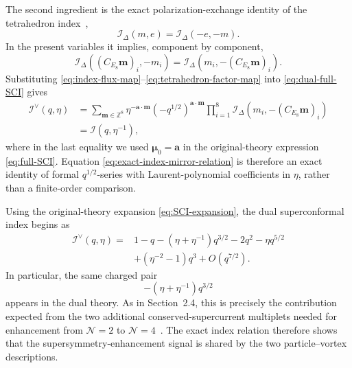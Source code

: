 \documentclass[11pt,a4paper]{article}
\numberwithin{equation}{section}
\begin{document}
The second ingredient is the exact polarization-exchange identity of the tetrahedron index~\cite{Dimofte:2011py},
\begin{equation}
  \mathcal I_\Delta(m,e)
  =\mathcal I_\Delta(-e,-m).
  \label{eq:tetrahedron-polarization-exchange}
\end{equation}
In the present variables it implies, component by component,
\begin{equation}
  \mathcal I_\Delta\!\left(
    (C_{E_8}\boldsymbol m)_i,-m_i
  \right)
  =
  \mathcal I_\Delta\!\left(
    m_i,-(C_{E_8}\boldsymbol m)_i
  \right).
  \label{eq:tetrahedron-factor-map}
\end{equation}
Substituting \eqref{eq:index-flux-map}--\eqref{eq:tetrahedron-factor-map} into \eqref{eq:dual-full-SCI} gives
\begin{align}
  \mathcal I^\vee(q,\eta)
  &={}
  \sum_{\boldsymbol m\in\mathbb Z^8}
  \eta^{-\boldsymbol a\cdot\boldsymbol m}
  \left(-q^{1/2}\right)^{\boldsymbol a\cdot\boldsymbol m}
  \prod_{i=1}^{8}
  \mathcal I_\Delta\!\left(
    m_i,-(C_{E_8}\boldsymbol m)_i
  \right)
  \nonumber\\
  &=\mathcal I(q,\eta^{-1}),
  \label{eq:exact-index-mirror-relation}
\end{align}
where in the last equality we used $\boldsymbol\mu_0=\boldsymbol a$ in the original-theory expression \eqref{eq:full-SCI}.  Equation \eqref{eq:exact-index-mirror-relation} is therefore an exact identity of formal $q^{1/2}$-series with Laurent-polynomial coefficients in $\eta$, rather than a finite-order comparison.

Using the original-theory expansion \eqref{eq:SCI-expansion}, the dual superconformal index begins as
\begin{equation}
\begin{aligned}
  \mathcal I^\vee(q,\eta)
  ={}&1-q-(\eta+\eta^{-1})q^{3/2}-2q^2
  -\eta q^{5/2}\\
  &+(\eta^{-2}-1)q^3+O(q^{7/2}).
\end{aligned}
  \label{eq:dual-SCI-expansion}
\end{equation}
In particular, the same charged pair
\begin{equation}
  -(\eta+\eta^{-1})q^{3/2}
  \label{eq:dual-extra-supercurrent-signal}
\end{equation}
appears in the dual theory.  As in Section~2.4, this is precisely the contribution expected from the two additional conserved-supercurrent multiplets needed for enhancement from $\mathcal N=2$ to $\mathcal N=4$~\cite{GangKimParkStubbs:2024Nahm}.  The exact index relation therefore shows that the supersymmetry-enhancement signal is shared by the two particle--vortex descriptions.
\end{document}
